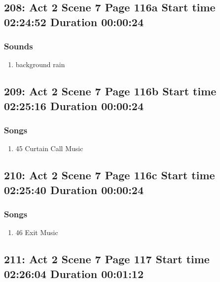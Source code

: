 \subsection{208: Act 2 Scene 7 Page 116a Start time 02:24:52 Duration 00:00:24}
\subsubsection{Sounds}
\begin{enumerate}
\item background rain
\end{enumerate}
\subsection{209: Act 2 Scene 7 Page 116b Start time 02:25:16 Duration 00:00:24}
\subsubsection{Songs}
\begin{enumerate}
\item 45 Curtain Call Music
\end{enumerate}
\subsection{210: Act 2 Scene 7 Page 116c Start time 02:25:40 Duration 00:00:24}
\subsubsection{Songs}
\begin{enumerate}
\item 46 Exit Music
\end{enumerate}
\subsection{211: Act 2 Scene 7 Page 117 Start time 02:26:04 Duration 00:01:12}

